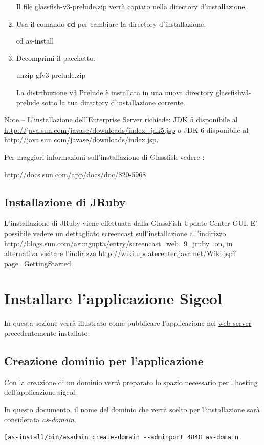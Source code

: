\documentclass[11pt,a4paper]{article}
\begin{document}
\begin{enumerate}
Il file glassfish-v3-prelude.zip verrà copiato nella directory d'installazione.
\item Usa il comando \textbf{cd} per cambiare la directory d'installazione.

cd as-install
\item Decomprimi il pacchetto.

unzip gfv3-prelude.zip

La distribuzione v3 Prelude è installata in una nuova directory glassfishv3-prelude sotto la tua directory d'installazione corrente.
\end{enumerate}

Note – L'installazione dell'Enterprise Server richiede:
JDK 5 disponibile al \url{http://java.sun.com/javase/downloads/index_jdk5.jsp} o 
JDK 6 disponibile al \url{http://java.sun.com/javase/downloads/index.jsp}. 

\bigskip
Per maggiori informazioni sull'installazione di Glassfish vedere : 

\url{http://docs.sun.com/app/docs/doc/820-5968}


\subsection{Installazione di JRuby}

L'installazione di JRuby viene effettuata dalla GlassFish Update Center GUI.
E' possibile vedere un dettagliato screencast sull'installazione all'indirizzo  \url{http://blogs.sun.com/arungupta/entry/screencast_web_9_jruby_on}, in alternativa visitare l'indirizzo \url{http://wiki.updatecenter.java.net/Wiki.jsp?page=GettingStarted}.

\newpage
\section{Installare l'applicazione Sigeol}
In questa sezione verrà illustrato come pubblicare l'applicazione nel \underline{web server} precedentemente installato.
\subsection{Creazione dominio per l'applicazione} 
Con la creazione di un dominio verrà preparato lo spazio necessario per l'\underline{hosting} dell'applicazione sigeol.

In questo documento, il nome del dominio che verrà scelto per l'installazione sarà considerata \textit{as-domain}.

\verb|[as-install/bin/asadmin create-domain --adminport 4848 as-domain|
\end{document}
